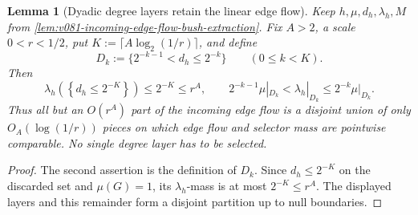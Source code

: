 \documentclass[10pt]{article}
\newtheorem{lemma}[theorem]{Lemma}
\begin{document}
\begin{lemma}[Dyadic degree layers retain the linear edge flow]
\label{lem:v081-edge-flow-degree-layers}
Keep \(h,\mu,d_h,\lambda_h,M\) from
\cref{lem:v081-incoming-edge-flow-bush-extraction}.  Fix \(A>2\), a scale \(0<r<1/2\), put
\(K:=\lceil A\log_2(1/r)\rceil\), and define
\[
D_k:=\{2^{-k-1}<d_h\le2^{-k}\}
\qquad
\left(0\le k<K\right).
\]
Then
\begin{equation}
\label{eq:v081-edge-flow-degree-layer-tail}
\boxed{
\lambda_h\!\left(\left\{d_h\le2^{-K}\right\}\right)
\le2^{-K}\le r^A,
\qquad
2^{-k-1}\mu|_{D_k}
<
\lambda_h|_{D_k}
\le
2^{-k}\mu|_{D_k}.
}
\end{equation}
Thus all but an \(O(r^A)\) part of the incoming edge flow is a disjoint union of only
\(O_A(\log(1/r))\) pieces on which edge flow and selector mass are pointwise comparable.  No
single degree layer has to be selected.
\end{lemma}

\begin{proof}
The second assertion is the definition of \(D_k\).  Since \(d_h\le2^{-K}\) on the discarded set
and \(\mu(G)=1\), its \(\lambda_h\)-mass is at most \(2^{-K}\le r^A\).  The displayed layers and
this remainder form a disjoint partition up to null boundaries.
\end{proof}
\end{document}
